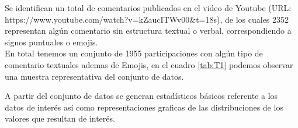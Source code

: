 Se identifican un total de  comentarios publicados en el video de Youtube (URL: https://www.youtube.com/watch?v=kZaucITWv00\&t=18s), de los cuales 2352 representan algún comentario sin estructura textual o verbal, correspondiendo a signos puntuales o emojis.\\

En total tenemos un conjunto de 1955 participaciones con algún tipo de comentario textuales ademas de Emojis, en el cuadro \ref{tab:T1} podemos observar una muestra representativa del conjunto de datos. \\

\begin{table}[H]
	\centering
	\caption{}
	\label{tab:T1}
\end{table}

A partir del conjunto de datos se generan estadísticos básicos referente a los datos de interés así como representaciones graficas de las distribuciones de los valores que resultan de interés.\\
 
